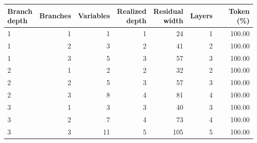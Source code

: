 \begin{center}\small
\begin{tabular}{@{}lrrrrrr@{}}
\toprule
\shortstack{Branch\\depth} & Branches & Variables & \shortstack{Realized\\depth} & \shortstack{Residual\\width} & Layers & Token (\%) \\
\midrule
1 & 1 & 1 & 1 & 24 & 1 & 100.00 \\
1 & 2 & 3 & 2 & 41 & 2 & 100.00 \\
1 & 3 & 5 & 3 & 57 & 3 & 100.00 \\
2 & 1 & 2 & 2 & 32 & 2 & 100.00 \\
2 & 2 & 5 & 3 & 57 & 3 & 100.00 \\
2 & 3 & 8 & 4 & 81 & 4 & 100.00 \\
3 & 1 & 3 & 3 & 40 & 3 & 100.00 \\
3 & 2 & 7 & 4 & 73 & 4 & 100.00 \\
3 & 3 & 11 & 5 & 105 & 5 & 100.00 \\
\bottomrule
\end{tabular}
\end{center}
